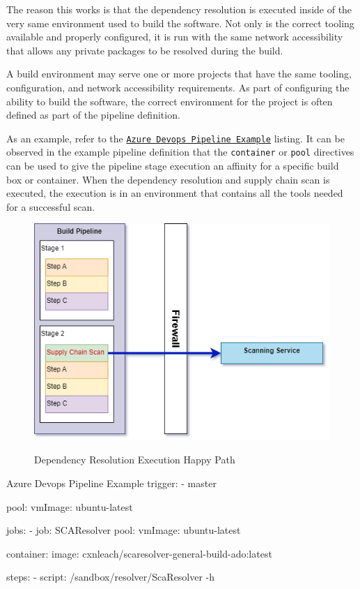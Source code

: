 The reason this works is that the dependency resolution is executed inside of
the very same environment used to build the software.  Not only is the correct 
tooling available and properly configured, it is run with the same network
accessibility that allows any private packages to be resolved during the build.

A build environment may serve one or more projects that have the same tooling,
configuration, and network accessibility requirements.  As part of configuring
the ability to build the software, the correct environment for the project
is often defined as part of the pipeline definition.  

As an example, refer to the 
\hyperref[listing:ado_pipeline]{\texttt{Azure Devops Pipeline Example}} listing.
It can be observed in the example pipeline definition that the \texttt{container} 
or \texttt{pool} directives can be used to give the pipeline stage execution an affinity 
for a specific build box or container. When the dependency resolution and supply chain scan
is executed, the execution is in an environment that contains all the tools
needed for a successful scan.



\begin{figure}[h]
    \caption{Dependency Resolution Execution Happy Path}
    \includegraphics[width=\textwidth]{graphics/dependency_resolution_happy_path.png}
    \label{fig:dependency_resolution_happy_path}
\end{figure}



\label{listing:ado_pipeline}
\begin{code}{Azure Devops Pipeline Example}{}{}
trigger:
    - master

pool:
    vmImage: ubuntu-latest

jobs:
    - job: SCAResolver
        pool:
            vmImage: ubuntu-latest

        container: 
            image: cxnleach/scaresolver-general-build-ado:latest

        steps:
            - script: /sandbox/resolver/ScaResolver -h
\end{code}




